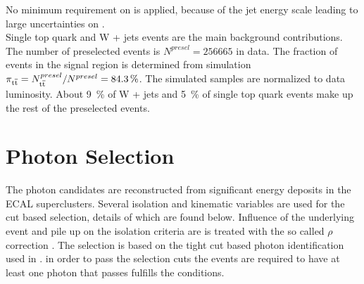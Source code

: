 No minimum requirement on \ETm is applied, because of the jet energy scale leading to large uncertainties on \ETm .\\
Single top quark and W + jets events are the main background contributions. The number of preselected events is $N^{presel} =256665$ in data. The fraction of \ttbar events in the \ttgamma signal region is determined from simulation $\pi_{\mathrm{t}\overline{\mathrm{t}}} = N^{presel}_{\mathrm{t}\overline{\mathrm{t}}} / N^{presel} = \SI{84.3}{\percent}$. The simulated samples are normalized to data luminosity. About \SI{9}{\percent} of W + jets and \SI{5}{\percent} of single top quark events make up the rest of the preselected events.\\

\section{Photon Selection}

The photon candidates are reconstructed from significant energy deposits in the ECAL superclusters. Several isolation and kinematic variables are used for the cut based selection, details of which are found below. Influence of the underlying event and pile up on the isolation criteria are is treated with the so called $\rho$ correction \cite{CMS-PAS-PFT-09-001}. The selection is based on the tight cut based photon identification used in \cite{CMS-PAS-HIG-13-006}. in order to pass the selection cuts the events are required to have at least one photon that passes fulfills the conditions.

